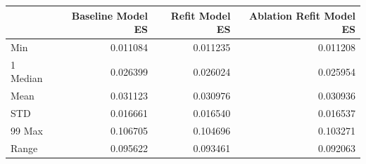 \begin{tabular}{lrrr}
\toprule
 & Baseline Model ES & Refit Model ES & Ablation Refit Model ES \\
\midrule
Min & 0.011084 & 0.011235 & 0.011208 \\
1%
Median & 0.026399 & 0.026024 & 0.025954 \\
Mean & 0.031123 & 0.030976 & 0.030936 \\
STD & 0.016661 & 0.016540 & 0.016537 \\
99%
Max & 0.106705 & 0.104696 & 0.103271 \\
Range & 0.095622 & 0.093461 & 0.092063 \\
\bottomrule
\end{tabular}
